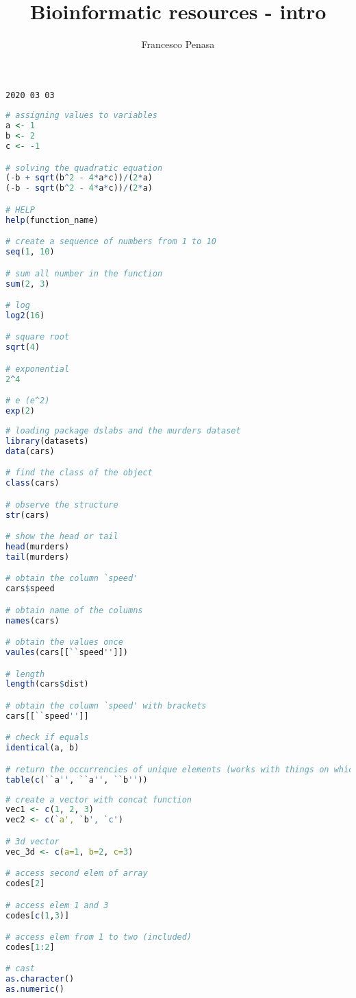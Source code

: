 \documentclass[11pt]{article}
\begin{document}
\author{Francesco Penasa}
\title{Bioinformatic resources - intro}
\maketitle

\medskip

\texttt{2020 03 03}

\begin{lstlisting}[language=R]
# assigning values to variables
a <- 1 
b <- 2
c <- -1

# solving the quadratic equation
(-b + sqrt(b^2 - 4*a*c))/(2*a)
(-b - sqrt(b^2 - 4*a*c))/(2*a)

# HELP
help(function_name)

# create a sequence of numbers from 1 to 10
seq(1, 10) 

# sum all number in the function
sum(2, 3)

# log
log2(16)

# square root
sqrt(4)

# exponential
2^4

# e (e^2)
exp(2)
\end{lstlisting}


\begin{lstlisting}[language=R]
# loading package dslabs and the murders dataset
library(datasets)
data(cars)

# find the class of the object
class(cars)

# observe the structure
str(cars)

# show the head or tail
head(murders)
tail(murders)

# obtain the column `speed'
cars$speed

# obtain name of the columns
names(cars)

# obtain the values once 
vaules(cars[[``speed'']])

# length
length(cars$dist)

# obtain the column `speed' with brackets
cars[[``speed'']]

# check if equals
identical(a, b)

# return the occurrencies of unique elements (works with things on which levels works)
table(c(``a'', ``a'', ``b''))
\end{lstlisting}


\begin{lstlisting}[language=R]
# create a vector with concat function
vec1 <- c(1, 2, 3)
vec2 <- c(`a', `b', `c')

# 3d vector
vec_3d <- c(a=1, b=2, c=3)

# access second elem of array
codes[2]

# access elem 1 and 3
codes[c(1,3)]

# access elem from 1 to two (included)
codes[1:2]

# cast
as.character()
as.numeric()
\end{lstlisting}
\end{document}

